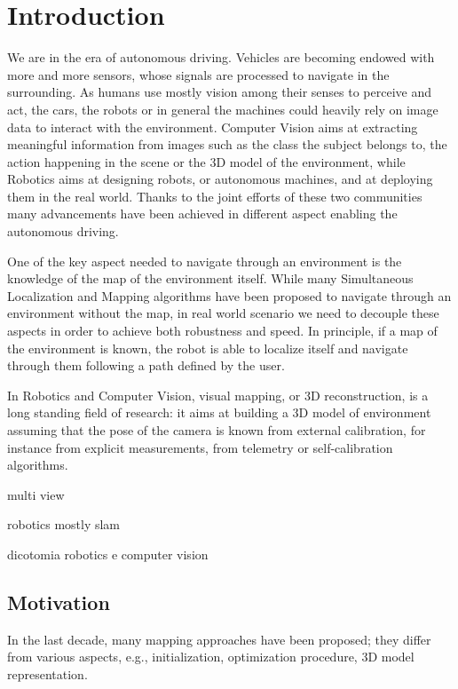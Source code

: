 
\chapter*{Introduction}
\label{sec:intro}
We are in the era of autonomous driving. Vehicles are becoming endowed with more and more sensors, whose signals are processed to navigate in the surrounding.
As humans use mostly vision among their senses to perceive and act, the cars, the robots or in general the machines could heavily rely on image data to interact with the environment.
Computer Vision aims at extracting meaningful information from images such as the class the subject belongs to, the action happening in the scene or the 3D model of the environment, while Robotics aims at designing robots, or autonomous machines, and at deploying them in the real world.
Thanks to the joint efforts of these two communities many advancements have been achieved in different aspect enabling the autonomous driving.

One of the key aspect needed to navigate through an environment is the knowledge of the map of the environment itself. 
While many Simultaneous Localization and Mapping algorithms have been proposed to navigate through an environment without the map, in real world scenario we need to decouple these aspects in order to achieve both robustness and speed.
In principle, if a map of the environment is known, the robot is able to localize itself and navigate through them following a path defined by the user.

In Robotics and Computer Vision, visual mapping, or 3D reconstruction, is a long standing field of research: it aims at building a 3D model of environment assuming that the pose of the camera is known from external calibration, for instance from explicit measurements, from telemetry or self-calibration algorithms.


multi view

robotics mostly slam


dicotomia robotics e computer vision

\section{Motivation}
In the last decade, many mapping approaches have been proposed; they differ from various aspects, e.g., initialization, optimization procedure, 3D model representation.

